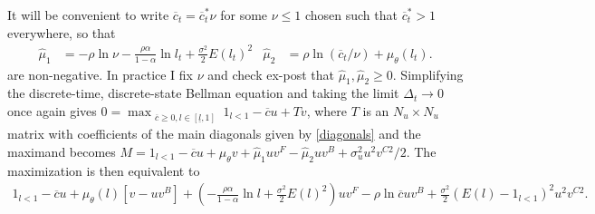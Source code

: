 \documentclass[11pt]{article}
\theoremstyle{plain}
\begin{document}
It will be convenient to write $\overline{c}_t = \overline{c}^*_t\nu$ for some $\nu \leq 1$ chosen such that $\overline{c}_t^* > 1$ everywhere, so that 
\begin{align*} 
\hat{\mu}_1 & = -\rho \ln \nu - \frac{\rho\alpha}{1-\alpha} \ln l_t + \frac{\sigma^2}{2}E(l_t)^2 &
\hat{\mu}_2 & = \rho \ln (\overline{c}_t/\nu) + \mu_{\theta}(l_t).
\end{align*}
are non-negative. In practice I fix $\nu$ and check ex-post that $\hat{\mu}_1, \hat{\mu}_2 \geq 0$. Simplifying the discrete-time, discrete-state Bellman equation and taking the limit $\Delta_t \rightarrow 0$ once again gives $0 = \max_{\substack{\overline{c} \geq 0, l \in [\underline{l},1]}} 1_{l<1} - \overline{c}u + Tv$, where $T$ is an $N_u \times N_u$ matrix with coefficients of the main diagonals given by \eqref{diagonals} and the maximand becomes $M = 1_{l<1} - \overline{c}u + \mu_{\theta}v + \hat{\mu}_1uv^F - \hat{\mu}_2uv^B + \sigma_u^2u^2v^{C2}/2$. The maximization is then equivalent to 
\begin{align*}
1_{l<1} - \overline{c}u + \mu_{\theta}(l)[v - uv^B] + {\left(- \frac{\rho\alpha}{1-\alpha} \ln l + \frac{\sigma^2}{2}E(l)^2 \right)}uv^F - \rho \ln \overline{c}uv^B + \frac{\sigma^2}{2} (E(l) - 1_{l<1})^2u^2v^{C2}.
\end{align*}
\end{document}
